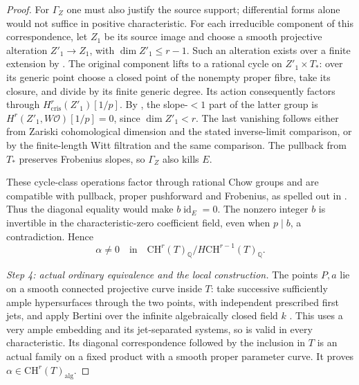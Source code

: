 \begin{proof}
For $\Gamma_Z$ one must also justify the source support; differential
forms alone would not suffice in positive characteristic. For each
irreducible component of this correspondence, let $Z_1$ be its
source image and choose a smooth projective alteration
$Z'_1\to Z_1$, with $\dim Z'_1\le r-1$. Such an alteration exists
over a finite extension by
\citet[Theorem~4.1 and Remark~4.2, printed p.~66]{D_DeJong1996Alterations}.
The original component lifts to a rational cycle on $Z'_1\times T_*$:
over its generic point choose a closed point of the nonempty proper
fibre, take its closure, and divide by its finite generic degree.
Its action consequently factors through
$H^r_{\mathrm{cris}}(Z'_1)[1/p]$. By
\citet[Theorem~1.1 and Section~2]{D_BerthelotBlochEsnault2007},
the slope-$<1$ part of the latter group is
$H^r(Z'_1,W\mathcal O)[1/p]=0$, since $\dim Z'_1<r$.
The last vanishing follows either from Zariski cohomological dimension
and the stated inverse-limit comparison, or by the finite-length Witt
filtration and the same comparison. The pullback from $T_*$ preserves
Frobenius slopes, so $\Gamma_Z$ also kills $E$.

These cycle-class operations factor through rational Chow groups and
are compatible with pullback, proper pushforward and Frobenius, as
spelled out in \citet[Section~2, printed p.~189]{D_Esnault2003}.
Thus the diagonal equality would make $b\operatorname{id}_E=0$.
The nonzero integer $b$ is invertible in the characteristic-zero
coefficient field, even when $p\mid b$, a contradiction. Hence
\[
       \alpha\ne0\quad\text{in}\quad
       \mathrm{CH}^r(T)_{\mathbb Q}/
                     H\mathrm{CH}^{r-1}(T)_{\mathbb Q}.
\]

\emph{Step 4: actual ordinary equivalence and the local construction.}
The points $P,a$ lie on a smooth connected projective curve inside
$T$: take successive sufficiently ample hypersurfaces through the two
points, with independent prescribed first jets, and apply Bertini over
the infinite algebraically closed field $k$
\citep[Lemmas 33.47.1 and 33.47.3]{D_StacksBertini0FD4}. This uses a very ample
embedding and its jet-separated systems, so is valid in every
characteristic. Its diagonal correspondence followed by the inclusion
in $T$ is an actual family on a fixed product with a smooth proper
parameter curve. It proves $\alpha\in\mathrm{CH}^r(T)_{\mathrm{alg}}$.


\end{proof}
